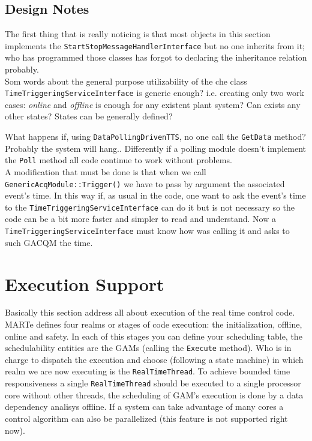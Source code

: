 \subsection{Design Notes}
The first thing that is really noticing is that most objects in this section implements the \texttt{StartStopMessageHandlerInterface} but no one inherits from it; who has programmed those classes has forgot to declaring the inheritance relation probably. \\


Som words about the general purpose utilizability of the che class \texttt{TimeTriggeringServiceInterface} is generic enough? i.e. creating only two work cases: \textit{online} and \textit{offline} is enough for any existent plant system? Can exists any other states? States can be generally defined?

What happens if, using \texttt{DataPollingDrivenTTS}, no one call the \texttt{GetData} method? Probably the system will hang.. Differently if a polling module doesn't implement the \texttt{Poll} method all code continue to work without problems. \\


A modification that must be done is that when we call \texttt{GenericAcqModule::Trigger()} we have to pass by argument the associated event's time. In this way if, as usual in the code, one want to ask the event's time to the \texttt{TimeTriggeringServiceInterface} can do it but is not necessary so the code can be a bit more faster and simpler to read and understand. Now a \texttt{TimeTriggeringServiceInterface} must know how was calling it and asks to such GACQM the time. \\



\section{Execution Support}
Basically this section address all about execution of the real time control code. MARTe defines four realms or stages of code execution: the initialization, offline, online and safety. In each of this stages you can define your scheduling table, the schedulability entities are the GAMs (calling the \texttt{Execute} method). Who is in charge to dispatch the execution and choose (following a state machine) in which realm we are now executing is the \texttt{RealTimeThread}. To achieve bounded time responsiveness a single \texttt{RealTimeThread} should be executed to a single processor core without other threads, the scheduling of GAM's execution is done by a data dependency analisys offline. If a system can take advantage of many cores a control algorithm can also be parallelized (this feature is not supported right now). \\


